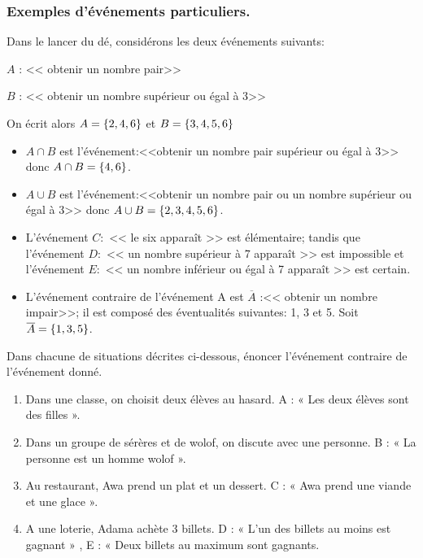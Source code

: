 \subsubsection*{Exemples d'événements particuliers.}
Dans le lancer du dé, considérons les deux événements suivants:
\begin{description}
\item $ A$ :  <<  obtenir un nombre pair>>
\item $ B $  :   <<  obtenir un nombre supérieur ou égal à 3>>
\end{description}
On écrit alors $ A=\left\{2,4,6\right\} $ et $ B=\left\{3,4,5,6\right\} $
\begin{itemize}
\item $ A\cap B $ est l'événement:<<obtenir un nombre pair supérieur ou égal à 3>>  donc $ A\cap B=\left\{4,6\right\} $.
\item  $ A\cup B $ est l'événement:<<obtenir un nombre pair ou  un nombre  supérieur ou égal à 3>>  donc $ A\cup B=\left\{2,3,4,5,6\right\} $.
\item  L'événement $ C: $  << le six apparaît >> est élémentaire; tandis que l'événement $ D: $  << un nombre  supérieur à 7 apparaît >> est impossible  et l'événement $ E: $  << un nombre inférieur ou égal à 7 apparaît >> est certain.
\item L'événement contraire de l'événement A est  $\overline{A}$ :<<  obtenir un nombre impair>>; il est composé des éventualités suivantes: 1, 3 et 5.\; Soit $\overline{A}=\left\{1,3,5\right\}$. 
\end{itemize}


\begin{exercice}

     Dans chacune de situations décrites ci-dessous, énoncer l'événement contraire de l'événement donné.
     \begin{enumerate}
\item Dans une classe, on choisit deux élèves au hasard. A : « Les deux élèves sont des filles ».
\item Dans un groupe de sérères et de wolof, on discute avec une personne. B : « La personne est un homme wolof ».
\item Au restaurant, Awa prend un plat et un dessert. C : « Awa prend une viande et une glace ».
\item A une loterie, Adama achète 3 billets.
D : « L'un des billets au moins est gagnant » , E : « Deux billets au maximum sont gagnants.
 \end{enumerate}
 \end{exercice}
 
